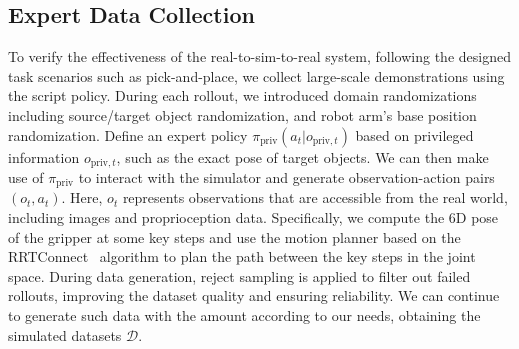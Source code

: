 \subsection{Expert Data Collection}
\label{sec:method:data-generation}
To verify the effectiveness of the real-to-sim-to-real system, following the designed task scenarios such as pick-and-place, we collect large-scale demonstrations using the script policy. 
During each rollout, we introduced domain randomizations including source/target object randomization, and robot arm's base position randomization.
Define an expert policy $\pi_\text{priv}(a_t | o_{\text{priv}, t})$ based on privileged information $o_{\text{priv}, t}$, such as the exact pose of target objects. We can then make use of $\pi_\text{priv}$ to interact with the simulator and generate observation-action pairs $(o_t, a_t)$.
Here, $o_t$ represents observations that are accessible from the real world, including images and proprioception data.
Specifically, we compute the 6D pose of the gripper at some key steps and use the motion planner based on the RRTConnect~\cite{rrtconnect} algorithm to plan the path between the key steps in the joint space.
During data generation, reject sampling is applied to filter out failed rollouts, improving the dataset quality and ensuring reliability.
We can continue to generate such data with the amount according to our needs, obtaining the simulated datasets $\mathcal{D}$. 



